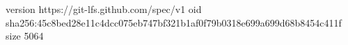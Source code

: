 version https://git-lfs.github.com/spec/v1
oid sha256:45c8bed28e11c4dcc075eb747bf321b1af0f79b0318e699a699d68b8454c411f
size 5064
